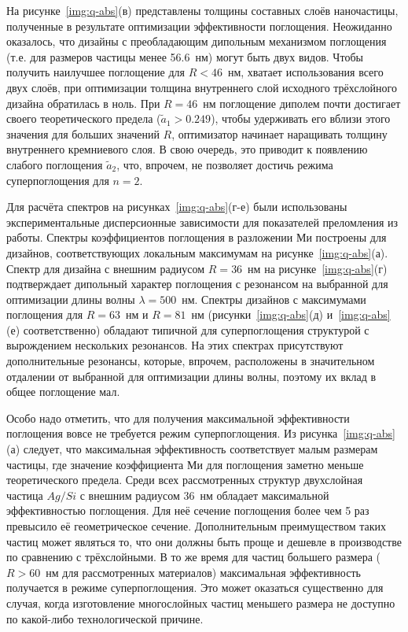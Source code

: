 На рисунке~\ref{img:q-abs}(в) представлены толщины составных слоёв
наночастицы, полученные в результате оптимизации эффективности
поглощения.  Неожиданно оказалось, что дизайны с преобладающим
дипольным механизмом поглощения (т.е. для размеров частицы менее
56.6~нм) могут быть двух видов.  Чтобы получить наилучшее поглощение
для $R<46$~нм, хватает использования всего двух слоёв, при оптимизации
толщина внутреннего слой исходного трёхслойного дизайна обратилась в
ноль.  При $R=46$~нм поглощение диполем почти достигает своего
теоретического предела ($\tilde{a}_1>0.249$), чтобы удерживать его
вблизи этого значения для больших значений $R$, оптимизатор начинает
наращивать толщину внутреннего кремниевого слоя.  В свою очередь, это
приводит к появлению слабого поглощения  $\tilde{a}_2$,
что, впрочем, не позволяет достичь режима суперпоглощения для $n=2$.

Для расчёта спектров на рисунках~\ref{img:q-abs}(г-е) были
использованы экспериментальные дисперсионные зависимости для
показателей преломления из работы\cite{palik-1997}. Спектры
коэффициентов поглощения в разложении Ми построены для дизайнов,
соответствующих локальным максимумам на
рисунке~\ref{img:q-abs}(а). Спектр для дизайна с внешним радиусом
$R=36$~нм на рисунке~\ref{img:q-abs}(г) подтверждает дипольный
характер поглощения с резонансом на выбранной для оптимизации длины
волны $\lambda=500$~нм.  Спектры дизайнов с максимумами поглощения для
$R=63$~нм и $R=81$~нм (рисунки~\ref{img:q-abs}(д) и~\ref{img:q-abs}(е)
соответственно) обладают типичной для суперпоглощения структурой с
вырождением нескольких резонансов. На этих спектрах присутствуют
дополнительные резонансы, которые, впрочем, расположены в значительном
отдалении от выбранной для оптимизации длины волны, поэтому их вклад в
общее поглощение мал.

Особо надо отметить, что для получения максимальной эффективности
поглощения вовсе не требуется режим суперпоглощения.  Из
рисунка~\ref{img:q-abs}(а) следует, что максимальная эффективность
соответствует малым размерам частицы, где значение коэффициента Ми для
поглощения заметно меньше теоретического предела.  Среди всех
рассмотренных структур двухслойная частица $Ag/Si$ с внешним радиусом
36~нм обладает максимальной эффективностью поглощения.  Для неё
сечение поглощения более чем 5 раз превысило её геометрическое
сечение. Дополнительным преимуществом таких частиц может являться то,
что они должны быть проще и дешевле в производстве по сравнению с
трёхслойными.  В то же время для частиц большего размера ($R>60$~нм
для рассмотренных материалов) максимальная эффективность получается в
режиме суперпоглощения.  Это может оказаться существенно для случая,
когда изготовление многослойных частиц меньшего размера не доступно по
какой-либо технологической причине.



